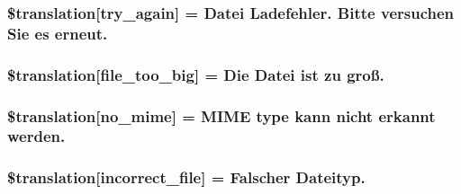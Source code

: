 \subsubsection[{\$translation}]{\setlength{\rightskip}{0pt plus 5cm}\$translation\mbox{[}\textquotesingle{}try\+\_\+again\textquotesingle{}\mbox{]} = \textquotesingle{}Datei Ladefehler. Bitte versuchen Sie es erneut.\textquotesingle{}}\label{class_8upload_8de___d_e_8php_a3afc377bd803683314f413a814243066}
\hypertarget{class_8upload_8de___d_e_8php_a476278eb4a0c3df56af068e2d511a741}{}
\subsubsection[{\$translation}]{\setlength{\rightskip}{0pt plus 5cm}\$translation\mbox{[}\textquotesingle{}file\+\_\+too\+\_\+big\textquotesingle{}\mbox{]} = \textquotesingle{}Die Datei ist zu groß.\textquotesingle{}}\label{class_8upload_8de___d_e_8php_a476278eb4a0c3df56af068e2d511a741}
\hypertarget{class_8upload_8de___d_e_8php_a191a55df8e3bb7f3c51b70f3c1932e02}{}
\subsubsection[{\$translation}]{\setlength{\rightskip}{0pt plus 5cm}\$translation\mbox{[}\textquotesingle{}no\+\_\+mime\textquotesingle{}\mbox{]} = \textquotesingle{}M\+I\+M\+E type kann nicht erkannt werden.\textquotesingle{}}\label{class_8upload_8de___d_e_8php_a191a55df8e3bb7f3c51b70f3c1932e02}
\hypertarget{class_8upload_8de___d_e_8php_a4d32343e2699edd6fd435f9c832cb9c7}{}
\subsubsection[{\$translation}]{\setlength{\rightskip}{0pt plus 5cm}\$translation\mbox{[}\textquotesingle{}incorrect\+\_\+file\textquotesingle{}\mbox{]} = \textquotesingle{}Falscher Dateityp.\textquotesingle{}}\label{class_8upload_8de___d_e_8php_a4d32343e2699edd6fd435f9c832cb9c7}
\hypertarget{class_8upload_8de___d_e_8php_a0dd3e4930ca1f59ae280f4b1006525cd}{}

